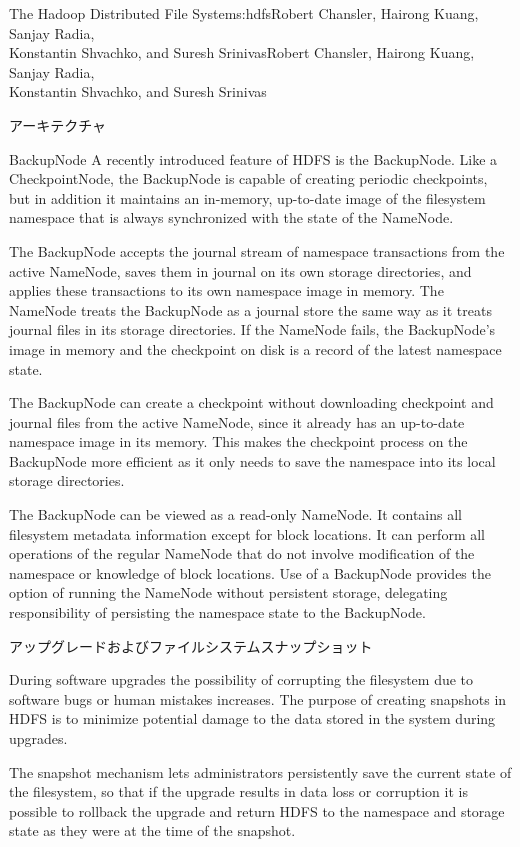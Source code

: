 \begin{aosachaptertoc}{The Hadoop Distributed File System}{s:hdfs}{Robert Chansler, Hairong Kuang, Sanjay Radia, \\ Konstantin Shvachko, and Suresh Srinivas}{Robert Chansler, Hairong Kuang, Sanjay Radia, \\ \hspace*{0.9cm} Konstantin Shvachko, and Suresh Srinivas}
\begin{aosasect1}{アーキテクチャ}
\begin{aosasect2}{BackupNode}
A recently introduced feature of HDFS is the BackupNode. Like a
CheckpointNode, the BackupNode is capable of creating periodic
checkpoints, but in addition it maintains an in-memory, up-to-date
image of the filesystem namespace that is always synchronized with
the state of the NameNode.

The BackupNode accepts the journal stream of namespace transactions
from the active NameNode, saves them in journal on its own storage
directories, and applies these transactions to its own namespace image
in memory. The NameNode treats the BackupNode as a journal store the
same way as it treats journal files in its storage directories. If the
NameNode fails, the BackupNode's image in memory and the checkpoint on
disk is a record of the latest namespace state.

The BackupNode can create a checkpoint without downloading checkpoint
and journal files from the active NameNode, since it already has an
up-to-date namespace image in its memory. This makes the checkpoint
process on the BackupNode more efficient as it only needs to save the
namespace into its local storage directories.

The BackupNode can be viewed as a read-only NameNode. It contains all
filesystem metadata information except for block locations. It can
perform all operations of the regular NameNode that do not involve
modification of the namespace or knowledge of block locations. Use of
a BackupNode provides the option of running the NameNode without
persistent storage, delegating responsibility of persisting the
namespace state to the BackupNode.

\end{aosasect2}

\begin{aosasect2}{アップグレードおよびファイルシステムスナップショット}

During software upgrades the possibility of corrupting the filesystem
due to software bugs or human mistakes increases. The purpose of
creating snapshots in HDFS is to minimize potential damage to the data
stored in the system during upgrades.

The snapshot mechanism lets administrators persistently save the
current state of the filesystem, so that if the upgrade results in
data loss or corruption it is possible to rollback the upgrade and
return HDFS to the namespace and storage state as they were at the
time of the snapshot.


\end{aosasect2}
\end{aosasect1}
\end{aosachaptertoc}
